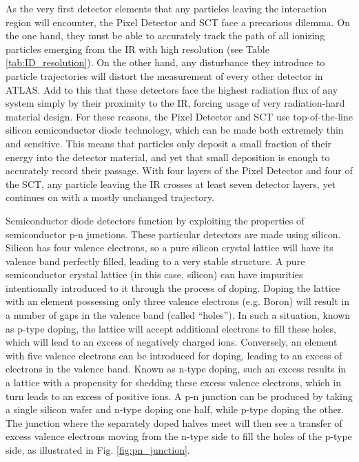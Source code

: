         As the very first detector elements that any particles leaving the interaction region will encounter, the Pixel Detector and SCT face a precarious dilemma.
        On the one hand, they must be able to accurately track the path of all ionizing particles
            emerging from the IR with high resolution (see Table \ref{tab:ID_resolution}).
        On the other hand, any disturbance they introduce to particle trajectories will distort the measurement of every other detector in ATLAS.
        Add to this that these detectors face the highest radiation flux of any system simply by their proximity to the IR, forcing usage of very radiation-hard material design.
        For these reasons, the Pixel Detector and SCT use top-of-the-line silicon semiconductor diode technology, which can be made both extremely thin and sensitive. 
        This means that particles only deposit a small fraction of their energy into the detector material, and yet that small deposition is enough to accurately record their passage.
        With four layers of the Pixel Detector and four of the SCT, any particle leaving the IR crosses at least seven detector layers, yet continues on with a mostly unchanged trajectory.

        

        Semiconductor diode detectors function by exploiting the properties of semiconductor p-n junctions.
        These particular detectors are made using silicon.
        Silicon has four valence electrons, so a pure silicon crystal lattice will have its valence band perfectly filled, leading to a very stable structure.
        A pure semiconductor crystal lattice (in this case, silicon) can have impurities intentionally introduced to it through the process of doping.
        Doping the lattice with an element possessing only three valence electrons (e.g. Boron) will result in a number of gaps in the valence band (called ``holes'').
        In such a situation, known as p-type doping, the lattice will accept additional electrons to fill these holes, which will lead to an excess of negatively charged ions.
        Conversely, an element with five valence electrons can be introduced for doping, leading to an excess of electrons in the valence band.
        Known as n-type doping, such an excess results in a lattice with a propensity for shedding these excess valence electrons, which in turn leads to an excess of positive ions.
        A p-n junction can be produced by taking a single silicon wafer and n-type doping one half, while p-type doping the other.
        The junction where the separately doped halves meet will then see a transfer of excess valence electrons moving from the n-type side to fill the holes of the p-type side, as illustrated in Fig. \ref{fig:pn_junction}.

